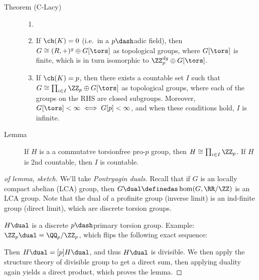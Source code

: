 \begin{description}
\item[Theorem (C-Lacy)]
\begin{enumerate}
\def\labelenumi{\alph{enumi}.}
\item[]
\item
  If \(\ch(K) = 0\) (i.e.~in a \(p\dash\)adic field), then
  \(G \cong (R, +)^g \oplus G[\tors]\) as topological groups, where
  \(G[\tors]\) is finite, which is in turn isomorphic to
  \(\ZZ_p^{dg} \oplus G[\tors]\).
\item
  If \(\ch(K) = p\), then there exists a countable set \(I\) such that
  \(G \cong \prod_{i\in I} \ZZ_p \oplus G[\tors]\) as topological
  groups, where each of the groups on the RHS are closed subgroups.
  Moreover, \(G[\tors] < \infty \iff G[p] < \infty\), and when these
  conditions hold, \(I\) is infinite.
\end{enumerate}
\item[Lemma]
If \(H\) is a a commutatve torsionfree pro-\(p\) group, then
\(H \cong \prod_{i\in I} \ZZ_p\). If \(H\) is 2nd countable, then \(I\)
is countable.
\end{description}

\begin{proof}[of lemma, sketch]

We'll take \emph{Pontryagin duals}. Recall that if \(G\) is an locally
compact abelian (LCA) group, then \(G\dual \definedas \hom(G, \RR/\ZZ)\)
is an LCA group. Note that the dual of a profinite group (inverse limit)
is an ind-finite group (direct limit), which are discrete torsion
groups.

\(H\dual\) is a discrete \(p\dash\)primary torsion group. Example:
\(\ZZ_p\dual = \QQ_p/\ZZ_p\), which flips the following exact sequence:

\begin{center}\end{center}

Then \(H\dual = [p] H\dual\), and thus \(H\dual\) is divisible. We then
apply the structure theory of divisible group to get a direct sum, then
applying duality again yields a direct product, which proves the lemma.

\end{proof}

